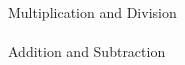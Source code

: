 \documentclass[11pt]{article}
\begin{document}
\begin{itemize}
\begin{itemize}
				\scalebox{2}{$*\hspace{3mm} /$} \hspace{15mm}\Large{Multiplication and Division}\\\\				
	
				 \scalebox{2}{$+\hspace{3mm} -$} \hspace{15mm}\Large{Addition and Subtraction}\\\\
				
		
				
		\end{itemize}

\end{itemize}


	
\end{document}
